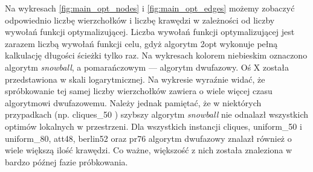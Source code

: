 Na wykresach \ref{fig:main_opt_nodes} i \ref{fig:main_opt_edges} możemy zobaczyć odpowiednio liczbę wierzchołków i liczbę krawędzi
w zależności od liczby wywołań funkcji optymalizującej. Liczba wywołań funkcji optymalizującej jest zarazem liczbą wywołań funkcji celu, gdyż
algorytm 2opt wykonuje pełną kalkulację długości ścieżki tylko raz.
Na wykresach kolorem niebieskim oznaczono algorytm \textit{snowball}, a pomarańczowym --- algorytm dwufazowy.
Oś X została przedstawiona w skali logarytmicznej.
Na wykresie wyraźnie widać, że spróbkowanie tej samej liczby wierzchołków zawiera o wiele więcej czasu algorytmowi dwufazowemu.
Należy jednak pamiętać, że w niektórych przypadkach (np. cliques\_50 ) szybszy algorytm \textit{snowball} nie odnalazł wszystkich optimów lokalnych w przestrzeni.
Dla wszystkich instancji cliques, uniform\_50 i uniform\_80, att48, berlin52 oraz pr76 algorytm dwufazowy znalazł również o wiele większą ilość krawędzi.
Co ważne, większość z nich została znaleziona w bardzo późnej fazie próbkowania.

